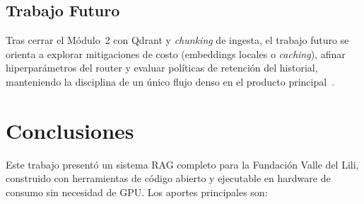 \documentclass[conference]{IEEEtran}
\begin{document}
\subsection{Trabajo Futuro}

Tras cerrar el Módulo~2 con Qdrant y \textit{chunking} de ingesta, el trabajo
futuro se orienta a explorar mitigaciones de costo (embeddings locales o
\textit{caching}), afinar hiperparámetros del router y evaluar políticas de
retención del historial, manteniendo la disciplina de un único flujo denso
en el producto principal~\cite{decision3m2}.

\section{Conclusiones}
\label{sec:conc}

Este trabajo presentó un sistema RAG completo para la Fundación Valle del
Lili, construido con herramientas de código abierto y ejecutable en hardware
de consumo sin necesidad de GPU. Los aportes principales son:
\end{document}
